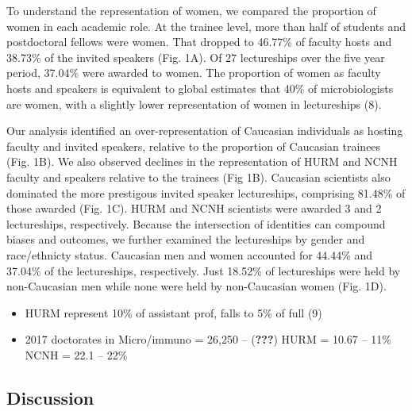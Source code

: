 \documentclass[10pt,]{article}
\begin{document}
To understand the representation of women, we compared the proportion of
women in each academic role. At the trainee level, more than half of
students and postdoctoral fellows were women. That dropped to 46.77\% of
faculty hosts and 38.73\% of the invited speakers (Fig. 1A). Of 27
lectureships over the five year period, 37.04\% were awarded to women.
The proportion of women as faculty hosts and speakers is equivalent to
global estimates that 40\% of microbiologists are women, with a slightly
lower representation of women in lectureships (8).

Our analysis identified an over-representation of Caucasian individuals
as hosting faculty and invited speakers, relative to the proportion of
Caucasian trainees (Fig. 1B). We also observed declines in the
representation of HURM and NCNH faculty and speakers relative to the
trainees (Fig 1B). Caucasian scientists also dominated the more
prestigous invited speaker lectureships, comprising 81.48\% of those
awarded (Fig. 1C). HURM and NCNH scientists were awarded 3 and 2
lectureships, respectively. Because the intersection of identities can
compound biases and outcomes, we further examined the lectureships by
gender and race/ethnicty status. Caucasian men and women accounted for
44.44\% and 37.04\% of the lectureships, respectively. Just 18.52\% of
lectureships were held by non-Caucasian men while none were held by
non-Caucasian women (Fig. 1D).

\begin{itemize}
\item
  HURM represent 10\% of assistant prof, falls to 5\% of full (9)
\item
  2017 doctorates in Micro/immuno = 26,250 -- ({\textbf{???}}) HURM =
  10.67 -- 11\% NCNH = 22.1 -- 22\%
\end{itemize}

\subsection{Discussion}\label{discussion}
\end{document}
